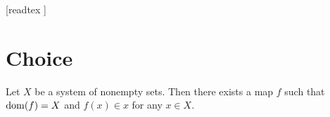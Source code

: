 \documentclass[10pt]{article}
\begin{document}
  \begin{imports}
    \begin{forthel}
      [readtex ]
    \end{forthel}
  \end{imports}


  \section{Choice}

  \begin{forthel}
    \begin{axiom}[title=Axiom of Choice,id=FOUNDATIONS_10_1897613305577472,printid]
      Let $X$ be a system of nonempty sets.
      Then there exists a map $f$ such that $\operatorname{dom}(f) = X$ and $f(x) \in x$ for any $x \in X$.
    \end{axiom}
  \end{forthel}
\end{document}
